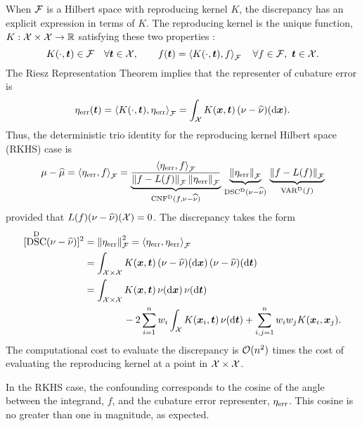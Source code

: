 \documentclass[graybox,footinfo]{svmult}
\DeclareMathOperator{\algn}{CNF}
\DeclareMathOperator{\disc}{DSC}
\DeclareMathOperator{\Var}{VAR}
\begin{document}
When $\calF$ is a Hilbert space with reproducing kernel $K$, the discrepancy has an 
explicit expression in terms of $K$.  The reproducing kernel is the unique function, $K: 
\calX \times \calX \to \R$ satisfying these two properties \cite[Sec.\ 1]{Aro50}:
\begin{equation}
K(\cdot,\bst) \in \calF \quad \forall \bst \in \calX, \qquad f(\bst) = 
\ip[\calF]{K(\cdot,\bst)}{f} 
\quad \forall f \in \calF, \ \bst \in \calX.
\end{equation}
The Riesz Representation Theorem implies that the representer of cubature error 
is 
\begin{equation}
\eta_{\err}(\bst) = \ip[\calF]{K(\cdot,\bst)}{\eta_{\err}} = \int_{\calX} K(\bsx,\bst) \, (\nu - 
\hnu)(\D\bsx).
\end{equation}
Thus, the deterministic trio identity for the reproducing kernel Hilbert space (RKHS) case 
is
\begin{equation}
\mu - \widehat{\mu} =  \ip[\calF]{\eta_{\err}}{f} = 
\underbrace{\frac{\ip[\calF]{\eta_{\err}}{f}}{\norm{f - 
L(f)}_{\calF} \norm{\eta_{\err}}_{\calF}} }_{\algn^\Dt(f,\nu - \hnu)}\, 
\underbrace{\norm{\eta_{\err}}_{\calF}}_{\disc^{\Dt}(\nu - \hnu)} \, 
\underbrace{\norm{f - L(f)}_{\calF}}_{\Var^\Dt(f)}
\end{equation}
provided that $L(f) (\nu - \hnu)(\calX) = 0$.  The discrepancy  takes the 
form \cite{Hic99a}
\begin{align}
\nonumber
[\disc^{\Dt}(\nu - \hnu)]^2 & = \norm{\eta_{\err}}_{\calF}^2 = 
\ip[\calF]{\eta_{\err}}{\eta_{\err}} 
\\
\nonumber
& = \int_{\calX \times \calX} K(\bsx,\bst) \, (\nu - \hnu)(\D \bsx) \, (\nu - \hnu)(\D \bst) \\
\nonumber
& = \int_{\calX \times \calX} K(\bsx,\bst) \, \nu(\D \bsx) \, \nu (\D \bst)  \\
& \qquad \qquad - 2 \sum_{i=1}^n w_i 
\int_{\calX} K(\bsx_i,\bst) \, \nu(\D \bst)+ \sum_{i,j = 1}^n w_iw_jK(\bsx_i,\bsx_j).
\end{align}
The computational cost to evaluate the discrepancy is $\calO(n^2)$ times the cost of 
evaluating the reproducing kernel at a point in $\calX \times \calX$. 

\begin{FJHLesson} \FJHLessonTwoHalf \end{FJHLesson}

In the RKHS case, the confounding corresponds to 
the cosine of the angle between the integrand, $f$, and the cubature error representer, 
$\eta_{\err}$.  This cosine is no greater than one in magnitude, as expected.
\end{document}
